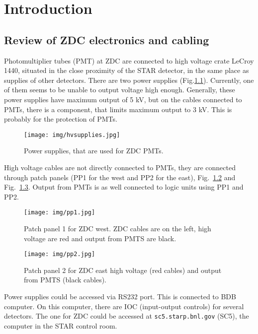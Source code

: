 \chapter{Introduction}

\section{Review of ZDC electronics and cabling}
Photomultiplier tubes (PMT) at ZDC are connected to high voltage crate LeCroy 1440, situated in the close proximity of the STAR detector, in the same place as supplies of other detectors. There are two power supplies (Fig.\ref{hvsupplies}). Currently, one of them seems to be unable to output voltage high enough. Generally, these power supplies have maximum output of 5 kV, but on the cables connected to PMTs, there is a component, that limits maximum output to 3 kV. This is probably for the protection of PMTs.

\begin{figure}[htb]
\begin{center}
\texttt{[image: img/hvsupplies.jpg]}
\end{center}
\caption{Power supplies, that are used for ZDC PMTs.}
\label{hvsupplies}
\end{figure}

High voltage cables are not directly connected to PMTs, they are connected through patch panels (PP1 for the west and PP2 for the east), Fig.~\ref{pp1} and Fig.~\ref{pp2}. Output from PMTs is as well connected to logic units using PP1 and PP2.

\begin{figure}[htb]
\begin{center}
\texttt{[image: img/pp1.jpg]}
\end{center}
\caption{Patch panel 1 for ZDC west.  ZDC cables are on the left, high voltage are red and output from PMTS are black.}
\label{pp1}
\end{figure}

\begin{figure}[htb]
\begin{center}
\texttt{[image: img/pp2.jpg]}
\end{center}
\caption{Patch panel 2 for ZDC east high voltage (red cables) and output from PMTS (black cables).}
\label{pp2}
\end{figure}

Power supplies could be accessed via RS232 port. This is connected to BDB computer. On this computer, there are IOC (input-output controls) for several detectors. The one for ZDC could be accessed at \texttt{sc5.starp.bnl.gov} (SC5), the computer in the STAR control room.

